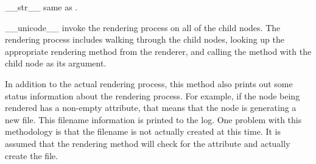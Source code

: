 \begin{methoddesc}[Renderable]{__str__}{}
same as .
\end{methoddesc}

\begin{methoddesc}[Renderable]{__unicode__}{}
invoke the rendering process on all of the child nodes.  The rendering process
includes walking through the child nodes, looking up the appropriate 
rendering method from the renderer, and calling the method with the child
node as its argument.

In addition to the actual rendering process, this method also prints out 
some status information about the rendering process.  For example, if 
the node being rendered has a non-empty  attribute, that
means that the node is generating a new file.  This filename information
is printed to the log.  One problem with this methodology is that the 
filename is not actually created at this time.  It is assumed that the
rendering method will check for the  attribute and actually
create the file.
\end{methoddesc}

